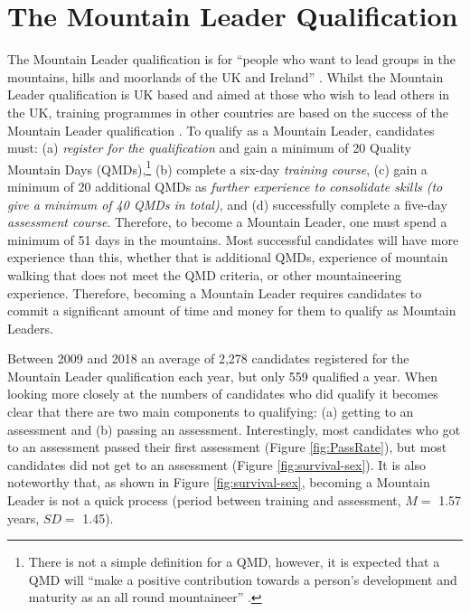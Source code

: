 \documentclass[
  12pt,
  a4paper,
]{book}
\begin{document}
\hypertarget{the-mountain-leader-qualification}{%
\section{The Mountain Leader Qualification}\label{the-mountain-leader-qualification}}

The Mountain Leader qualification is for ``people who want to lead groups in the mountains, hills and moorlands of the UK and Ireland'' \citep[p 5]{MTUK2015a}. Whilst the Mountain Leader qualification is UK based and aimed at those who wish to lead others in the UK, training programmes in other countries are based on the success of the Mountain Leader qualification \citep{UIAA2015}. To qualify as a Mountain Leader, candidates must: (a) \emph{register for the qualification} and gain a minimum of 20 Quality Mountain Days (QMDs),\footnote{There is not a simple definition for a QMD, however, it is expected that a QMD will ``make a positive contribution towards a person's development and maturity as an all round mountaineer'' \citep{MountainTraining2019}.} (b) complete a six-day \emph{training course}, (c) gain a minimum of 20 additional QMDs as \emph{further experience to consolidate skills (to give a minimum of 40 QMDs in total)}, and (d) successfully complete a five-day \emph{assessment course}. Therefore, to become a Mountain Leader, one must spend a minimum of 51 days in the mountains. Most successful candidates will have more experience than this, whether that is additional QMDs, experience of mountain walking that does not meet the QMD criteria, or other mountaineering experience. Therefore, becoming a Mountain Leader requires candidates to commit a significant amount of time and money for them to qualify as Mountain Leaders.

Between 2009 and 2018 an average of 2,278 candidates registered for the Mountain Leader qualification each year, but only 559 qualified a year. When looking more closely at the numbers of candidates who did qualify it becomes clear that there are two main components to qualifying: (a) getting to an assessment and (b) passing an assessment. Interestingly, most candidates who got to an assessment passed their first assessment (Figure \ref{fig:PassRate}), but most candidates did not get to an assessment (Figure \ref{fig:survival-sex}). It is also noteworthy that, as shown in Figure \ref{fig:survival-sex}, becoming a Mountain Leader is not a quick process (period between training and assessment, \(M =\) 1.57 years, \(SD =\) 1.45).
\end{document}
